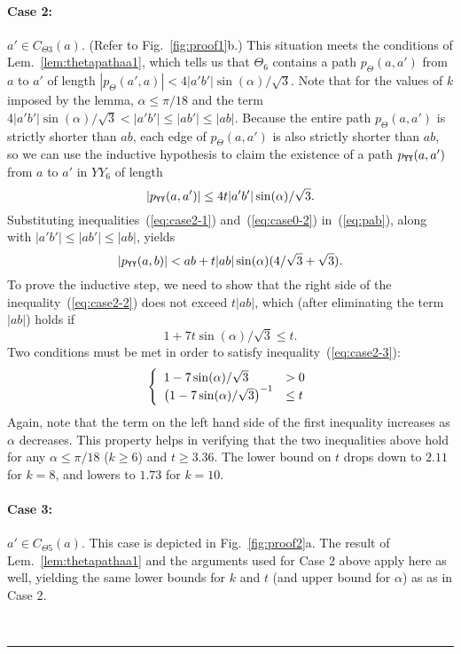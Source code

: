 \documentclass[11pt]{article}
\newcommand\cone{{C}}
\newcommand\pyy{p_{{\tt YY}}}
\newcommand{\qed}{\rule{0.5em}{1.5ex}}
\newcommand{\fqed}{{\hfill~\qed}}
\newenvironment{proof}{{\noindent \bf Proof.}}
                      {{\hfill \fqed} \vspace{1em}}
\begin{document}
\begin{proof}
\paragraph{Case 2:} $a' \in \cone_{\Theta3}(a)$. (Refer to Fig.~\ref{fig:proof1}b.) This situation meets the conditions of Lem.~\ref{lem:thetapathaa1}, which tells us that $\Theta_{6}$ contains a path $p_\Theta(a,a')$ from $a$ to $a'$ of length $|p_\Theta(a',a)| < 4|a'b'|\sin(\alpha)/\sqrt{3}$. Note that for the values of $k$ imposed by the lemma, $\alpha \le \pi/18$ and the term $4|a'b'|\sin(\alpha)/\sqrt{3} < |a'b'| \le |ab'| \le |ab|$. Because the entire path $p_\Theta(a, a')$ is strictly shorter than $ab$, each edge of $p_\Theta(a,a')$ is also strictly shorter than $ab$, so we can use the inductive hypothesis to claim the existence of a path $\pyy(a,a')$ from $a$ to $a'$ in $YY_6$ of length
\begin{equation}
|\pyy(a,a')| \le 4t|a'b'|\sin(\alpha)/\sqrt{3}.
\label{eq:case2-1}
\end{equation}
Substituting inequalities~(\ref{eq:case2-1}) and~(\ref{eq:case0-2}) in~(\ref{eq:pab}), along with $|a'b'| \le |ab'| \le |ab|$,  yields \begin{equation}
|\pyy(a,b)| < ab + t|ab|\sin(\alpha)(4/\sqrt{3} + \sqrt{3}).
\label{eq:case2-2}
\end{equation}
To prove the inductive step, we need to show that the right side of the inequality~(\ref{eq:case2-2}) does not exceed $t|ab|$, which (after eliminating the term $|ab|$) holds if
\begin{equation}
1 + 7t\sin(\alpha)/\sqrt{3} \le t.
\label{eq:case2-3}
\end{equation}
Two conditions must be met in order to satisfy inequality~(\ref{eq:case2-3}):
\[
  \left\{
  \begin{array}{l l}
   1-7\sin(\alpha)/\sqrt{3} & > 0 \\
   \left(1-7\sin(\alpha)/\sqrt{3}\right)^{-1} & \le t\\
  \end{array} \right.
\]
Again, note that the term on the left hand side of the first inequality increases as $\alpha$ decreases. This property helps in verifying that the two inequalities above hold for any $\alpha \le \pi/18$ ($k \ge 6$) and $t \ge 3.36$. The lower bound on $t$ drops down to $2.11$ for $k = 8$, and lowers to $1.73$ for $k = 10$.

\paragraph{Case 3:} $a' \in \cone_{\Theta5}(a)$. This case is depicted in Fig.~\ref{fig:proof2}a. The result of  Lem.~\ref{lem:thetapathaa1} and the arguments used for Case 2 above apply here as well, yielding the same lower bounds for $k$ and $t$ (and upper bound for $\alpha$) as as in Case 2.


\end{proof}
\end{document}
